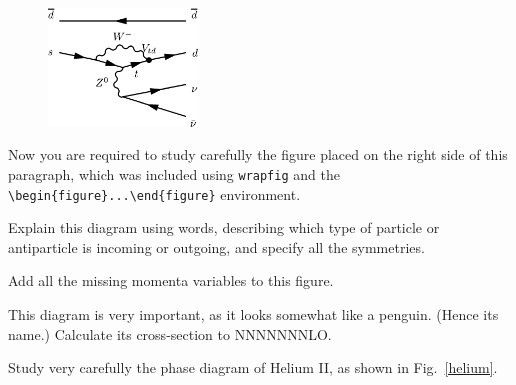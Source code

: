 \documentclass[11pt,a4paper]{article}
\begin{document}
\begin{figure}
\centering
\includegraphics[width=40mm]{fig/penguin}
\vspace*{-10mm}
\end{figure}
Now you are required to study carefully the figure placed on the right side of this
paragraph, which was included using \texttt{wrapfig} and the
\verb|\begin{figure}...\end{figure}| environment.

\begin{exenumerate} %
\item Explain this diagram using words, describing which type of particle or antiparticle
  is incoming or outgoing, and specify all the symmetries.
\item Add all the missing momenta variables to this figure.
\end{exenumerate}
\begin{exenumerate}
\item This diagram is very important, as it looks somewhat like a penguin. (Hence its
  name.) Calculate its cross-section to NNNNNNNLO.
\end{exenumerate}


\clearpage


Study very carefully the phase diagram of Helium II, as shown in Fig.~\ref{helium}.
\end{document}
